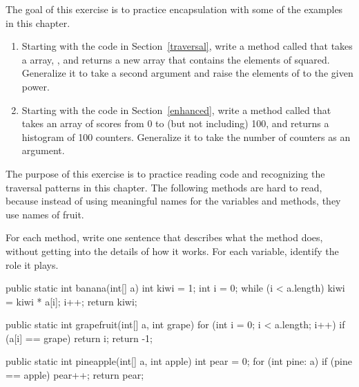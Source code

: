 \begin{exercise}  %

The goal of this exercise is to practice encapsulation with some of the examples in this chapter.

\begin{enumerate}

\item Starting with the code in Section~\ref{traversal}, write a method called  that takes a  array, , and returns a new array that contains the elements of  squared.
Generalize it to take a second argument and raise the elements of  to the given power.

\item Starting with the code in Section~\ref{enhanced}, write a method called  that takes an  array of scores from 0 to (but not including) 100, and returns a histogram of 100 counters.
Generalize it to take the number of counters as an argument.

\end{enumerate}

\end{exercise}


\begin{exercise}  %

The purpose of this exercise is to practice reading code and recognizing the traversal patterns in this chapter.
The following methods are hard to read, because instead of using meaningful names for the variables and methods, they use names of fruit.

For each method, write one sentence that describes what the method does, without getting into the details of how it works.
For each variable, identify the role it plays.

\begin{code}
public static int banana(int[] a) {
    int kiwi = 1;
    int i = 0;
    while (i < a.length) {
        kiwi = kiwi * a[i];
        i++;
    }
    return kiwi;
}
\end{code}

\begin{code}
public static int grapefruit(int[] a, int grape) {
    for (int i = 0; i < a.length; i++) {
        if (a[i] == grape) {
            return i;
        }
    }
    return -1;
}
\end{code}

\begin{code}
public static int pineapple(int[] a, int apple) {
    int pear = 0;
    for (int pine: a) {
        if (pine == apple) {
            pear++;
        }
    }
    return pear;
}
\end{code}

\end{exercise}


